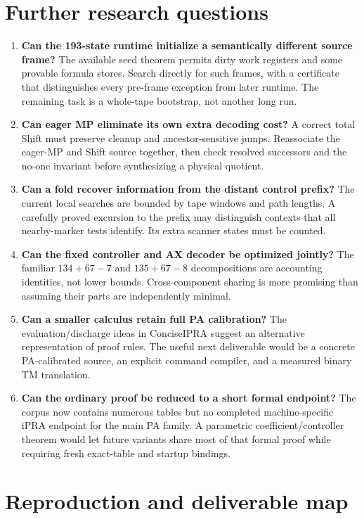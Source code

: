 \documentclass[11pt,letterpaper]{article}
\begin{document}
\section{Further research questions}

\begin{enumerate}
\item \textbf{Can the 193-state runtime initialize a semantically different
source frame?} The available seed theorem permits dirty work registers and
some provable formula stores. Search directly for such frames, with a
certificate that distinguishes every pre-frame exception from later runtime.
The remaining task is a whole-tape bootstrap, not another long run.
\item \textbf{Can eager MP eliminate its own extra decoding cost?} A correct
total Shift must preserve cleanup and ancestor-sensitive jumps. Reassociate
the eager-MP and Shift source together, then check resolved successors and
the no-one invariant before synthesizing a physical quotient.
\item \textbf{Can a fold recover information from the distant control prefix?}
The current local searches are bounded by tape windows and path lengths.
A carefully proved excursion to the prefix may distinguish contexts that
all nearby-marker tests identify. Its extra scanner states must be counted.
\item \textbf{Can the fixed controller and AX decoder be optimized jointly?}
The familiar $134+67-7$ and $135+67-8$ decompositions are accounting
identities, not lower bounds. Cross-component sharing is more promising
than assuming their parts are independently minimal.
\item \textbf{Can a smaller calculus retain full PA calibration?} The
evaluation/discharge ideas in ConciseIPRA suggest an alternative representation
of proof rules. The useful next deliverable would be a concrete PA-calibrated
source, an explicit command compiler, and a measured binary TM translation.
\item \textbf{Can the ordinary proof be reduced to a short formal endpoint?}
The corpus now contains numerous tables but no completed machine-specific
iPRA endpoint for the main PA family. A parametric coefficient/controller
theorem would let future variants share most of that formal proof while
requiring fresh exact-table and startup bindings.
\end{enumerate}

\section{Reproduction and deliverable map}
\end{document}
